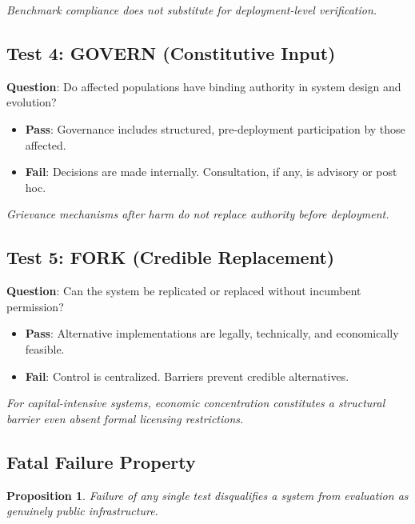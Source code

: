 \documentclass[11pt,a4paper]{article}
\newtheorem{proposition}{Proposition}
\begin{document}
\textit{Benchmark compliance does not substitute for deployment-level verification.}

\subsection{Test 4: GOVERN (Constitutive Input)}

\textbf{Question}: Do affected populations have binding authority in system design and evolution?

\begin{itemize}
    \item \textbf{Pass}: Governance includes structured, pre-deployment participation by those affected.
    \item \textbf{Fail}: Decisions are made internally. Consultation, if any, is advisory or post hoc.
\end{itemize}

\textit{Grievance mechanisms after harm do not replace authority before deployment.}

\subsection{Test 5: FORK (Credible Replacement)}

\textbf{Question}: Can the system be replicated or replaced without incumbent permission?

\begin{itemize}
    \item \textbf{Pass}: Alternative implementations are legally, technically, and economically feasible.
    \item \textbf{Fail}: Control is centralized. Barriers prevent credible alternatives.
\end{itemize}

\textit{For capital-intensive systems, economic concentration constitutes a structural barrier even absent formal licensing restrictions.}

\subsection{Fatal Failure Property}

\begin{proposition}
Failure of any single test disqualifies a system from evaluation as genuinely public infrastructure.
\end{proposition}
\end{document}
